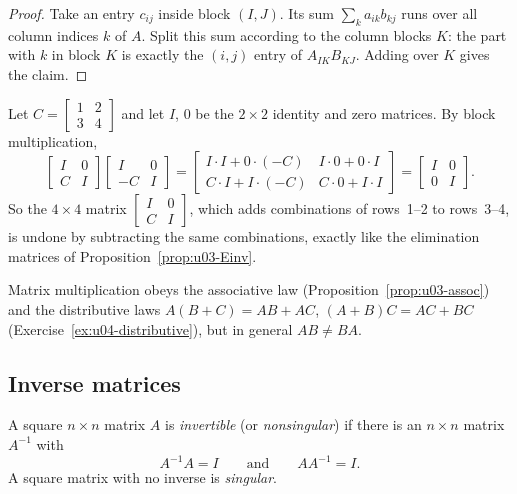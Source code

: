 \begin{proof}
Take an entry $c_{ij}$ inside block $(I,J)$. Its sum $\sum_k a_{ik}b_{kj}$ runs over all
column indices $k$ of $A$. Split this sum according to the column blocks $K$: the part with
$k$ in block $K$ is exactly the $(i,j)$ entry of $A_{IK}B_{KJ}$. Adding over $K$ gives the
claim.
\end{proof}

\begin{example}\label{ex:u04-blocks}
Let $C=\begin{bmatrix} 1 & 2\\ 3 & 4\end{bmatrix}$ and let $I$, $0$ be the $2\times2$ identity
and zero matrices. By block multiplication,
\[
  \begin{bmatrix} I & 0\\ C & I\end{bmatrix}\begin{bmatrix} I & 0\\ -C & I\end{bmatrix}
  =\begin{bmatrix} I\cdot I+0\cdot(-C) & I\cdot0+0\cdot I\\ C\cdot I+I\cdot(-C) & C\cdot 0+I\cdot I\end{bmatrix}
  =\begin{bmatrix} I & 0\\ 0 & I\end{bmatrix}.
\]
So the $4\times4$ matrix $\begin{bmatrix} I & 0\\ C & I\end{bmatrix}$, which adds combinations
of rows~1--2 to rows~3--4, is undone by subtracting the same combinations, exactly like the
elimination matrices of Proposition~\ref{prop:u03-Einv}.
\end{example}

Matrix multiplication obeys the associative law (Proposition~\ref{prop:u03-assoc}) and the
distributive laws $A(B+C)=AB+AC$, $(A+B)C=AC+BC$ (Exercise~\ref{ex:u04-distributive}), but
in general $AB\neq BA$.

\subsection{Inverse matrices}

\begin{definition}\label{def:u04-inverse}
A square $n\times n$ matrix $A$ is \emph{invertible} (or \emph{nonsingular}) if there is an
$n\times n$ matrix $A^{-1}$ with
\[
  A^{-1}A=I\qquad\text{and}\qquad AA^{-1}=I .
\]
A square matrix with no inverse is \emph{singular}.
\end{definition}

